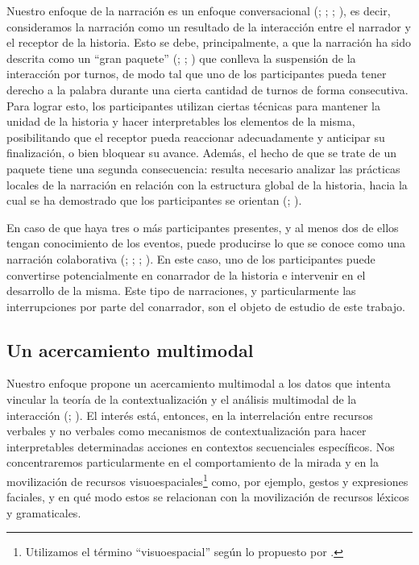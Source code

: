 \documentclass[output=paper]{../langscibook}
\begin{document}
Nuestro enfoque de la narración es un enfoque conversacional (\citealt{Jefferson1978}; \citealt{GülichQuasthoff1986}; \citealt{Sacks1995}; \citealt{Mandelbaum2012}), es decir, consideramos la narración como un resultado de la interacción entre el narrador y el receptor de la historia. Esto se debe, principalmente, a que la narración ha sido descrita como un “gran paquete” (\citealt{Jefferson1988}; \citealt{Sacks1995}; \citealt{Couper-KuhlenSelting2017}) que conlleva la suspensión de la interacción por turnos, de modo tal que uno de los participantes pueda tener derecho a la palabra durante una cierta cantidad de turnos de forma consecutiva. Para lograr esto, los participantes utilizan ciertas técnicas para mantener la unidad de la historia y hacer interpretables los elementos de la misma, posibilitando que el receptor pueda reaccionar adecuadamente y anticipar su finalización, o bien bloquear su avance. Además, el hecho de que se trate de un paquete tiene una segunda consecuencia: resulta necesario analizar las prácticas locales de la narración en relación con la estructura global de la historia, hacia la cual se ha demostrado que los participantes se orientan (\citealt{Labov1972book}; \citealt{Couper-KuhlenSelting2017}).

En caso de que haya tres o más participantes presentes, y al menos dos de ellos tengan conocimiento de los eventos, puede producirse lo que se conoce como una narración colaborativa (\citealt{Quasthoff1980}; \citealt{Goodwin1981}; \citealt{Mandelbaum1987}; \citealt{Sacks1995}). En este caso, uno de los participantes puede convertirse potencialmente en conarrador de la historia e intervenir en el desarrollo de la misma. Este tipo de narraciones, y particularmente las interrupciones por parte del conarrador, son el objeto de estudio de este trabajo.

\subsection{Un acercamiento multimodal}

Nuestro enfoque propone un acercamiento multimodal a los datos que intenta vincular la teoría de la contextualización \citep{Gumperz1982} y el análisis multimodal de la interacción (\citealt{StiversSidnell2005}; \citealt{Mondada2019}). El interés está, entonces, en la interrelación entre recursos verbales y no verbales como mecanismos de contextualización para hacer interpretables determinadas acciones en contextos secuenciales específicos. Nos concentraremos particularmente en el comportamiento de la mirada y en la movilización de recursos visuoespaciales\footnote{Utilizamos el término “visuoespacial” según lo propuesto por  \citet{StiversSidnell2005}.} como, por ejemplo, gestos y expresiones faciales, y en qué modo estos se relacionan con la movilización de recursos léxicos y gramaticales.
\end{document}
